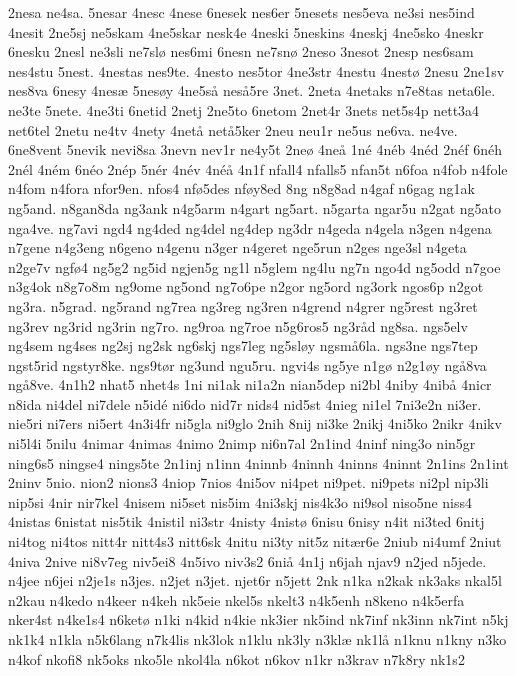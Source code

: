 {2nesa
ne4sa.
5nesar
4nesc
4nese
6nesek
nes6er
5nesets
nes5eva
ne3si
nes5ind
4nesit
2ne5sj
ne5skam
4ne5skar
nesk4e
4neski
5neskins
4neskj
4ne5sko
4neskr
6nesku
2nesl
ne3sli
ne7slø
nes6mi
6nesn
ne7snø
2neso
3nesot
2nesp
nes6sam
nes4stu
5nest.
4nestas
nes9te.
4nesto
nes5tor
4ne3str
4nestu
4nestø
2nesu
2ne1sv
nes8va
6nesy
4nesæ
5nesøy
4ne5så
neså5re
3net.
2neta
4netaks
n7e8tas
neta6le.
ne3te
5nete.
4ne3ti
6netid
2netj
2ne5to
6netom
2net4r
3nets
net5s4p
nett3a4
net6tel
2netu
ne4tv
4nety
4netå
netå5ker
2neu
neu1r
ne5us
ne6va.
ne4ve.
6ne8vent
5nevik
nevi8sa
3nevn
nev1r
ne4y5t
2neø
4neå
1né
4néb
4néd
2néf
6néh
2nél
4ném
6néo
2nép
5nér
4név
4néå
4n1f
nfall4
nfalls5
nfan5t
n6foa
n4fob
n4fole
n4fom
n4fora
nfor9en.
nfos4
nfø5des
nføy8ed
8ng
n8g8ad
n4gaf
n6gag
ng1ak
ng5and.
n8gan8da
ng3ank
n4g5arm
n4gart
ng5art.
n5garta
ngar5u
n2gat
ng5ato
nga4ve.
ng7avi
ngd4
ng4ded
ng4del
ng4dep
ng3dr
n4geda
n4gela
n3gen
n4gena
n7gene
n4g3eng
n6geno
n4genu
n3ger
n4geret
nge5run
n2ges
nge3sl
n4geta
n2ge7v
ngfø4
ng5g2
ng5id
ngjen5g
ng1l
n5glem
ng4lu
ng7n
ngo4d
ng5odd
n7goe
n3g4ok
n8g7o8m
ng9ome
ng5ond
ng7o6pe
n2gor
ng5ord
ng3ork
ngos6p
n2got
ng3ra.
n5grad.
ng5rand
ng7rea
ng3reg
ng3ren
n4grend
n4grer
ng5rest
ng3ret
ng3rev
ng3rid
ng3rin
ng7ro.
ng9roa
ng7roe
n5g6ros5
ng3råd
ng8sa.
ngs5elv
ng4sem
ng4ses
ng2sj
ng2sk
ng6skj
ngs7leg
ng5sløy
ngsmå6la.
ngs3ne
ngs7tep
ngst5rid
ngstyr8ke.
ngs9tør
ng3und
ngu5ru.
ngvi4s
ng5ye
n1gø
n2g1øy
ngå8va
ngå8ve.
4n1h2
nhat5
nhet4s
1ni
ni1ak
ni1a2n
nian5dep
ni2bl
4niby
4nibå
4nicr
n8ida
ni4del
ni7dele
n5idé
ni6do
nid7r
nids4
nid5st
4nieg
ni1el
7ni3e2n
ni3er.
nie5ri
ni7ers
ni5ert
4n3i4fr
ni5gla
ni9glo
2nih
8nij
ni3ke
2nikj
4ni5ko
2nikr
4nikv
ni5l4i
5nilu
4nimar
4nimas
4nimo
2nimp
ni6n7al
2n1ind
4ninf
ning3o
nin5gr
ning6s5
ningse4
nings5te
2n1inj
n1inn
4ninnb
4ninnh
4ninns
4ninnt
2n1ins
2n1int
2ninv
5nio.
nion2
nions3
4niop
7nios
4ni5ov
ni4pet
ni9pet.
ni9pets
ni2pl
nip3li
nip5si
4nir
nir7kel
4nisem
ni5set
nis5im
4ni3skj
nis4k3o
ni9sol
niso5ne
niss4
4nistas
6nistat
nis5tik
4nistil
ni3str
4nisty
4nistø
6nisu
6nisy
n4it
ni3ted
6nitj
ni4tog
ni4tos
nitt4r
nitt4s3
nitt6sk
4nitu
ni3ty
nit5z
nitær6e
2niub
ni4umf
2niut
4niva
2nive
ni8v7eg
niv5ei8
4n5ivo
niv3s2
6niå
4n1j
n6jah
njav9
n2jed
n5jede.
n4jee
n6jei
n2je1s
n3jes.
n2jet
n3jet.
njet6r
n5jett
2nk
n1ka
n2kak
nk3aks
nkal5l
n2kau
n4kedo
n4keer
n4keh
nk5eie
nkel5s
nkelt3
n4k5enh
n8keno
n4k5erfa
nker4st
n4ke1s4
n6ketø
n1ki
n4kid
n4kie
nk3ier
nk5ind
nk7inf
nk3inn
nk7int
n5kj
nk1k4
n1kla
n5k6lang
n7k4lis
nk3lok
n1klu
nk3ly
n3klæ
nk1lå
n1knu
n1kny
n3ko
n4kof
nkofi8
nk5oks
nko5le
nkol4la
n6kot
n6kov
n1kr
n3krav
n7k8ry
nk1s2
}
